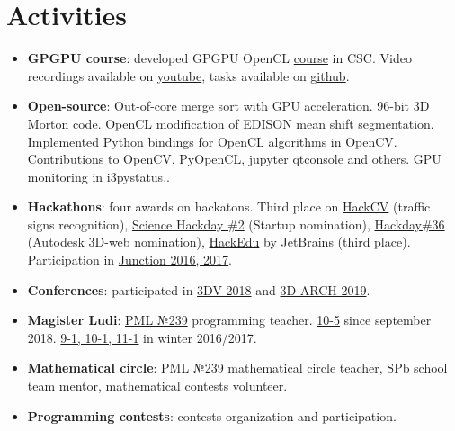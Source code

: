 \documentclass[11pt,oneside]{article}
\newcommand{\hhref}[2]{\href{#1}{\color{blue}#2}}
\begin{document}
\vspace{-9pt}
\section*{\textbf{Activities}}
\vspace{-9pt}

\begin{itemize}
    \item{\textbf{GPGPU course}}: developed GPGPU OpenCL \hhref{https://compscicenter.ru/courses/video_cards_computation/2018-autumn/classes/}{course} in CSC. Video recordings available on \hhref{https://www.youtube.com/watch?v=L79PgDOcVfw&list=PLlb7e2G7aSpTgwAm0GBkvn5XA0NokovJJ}{youtube}, tasks available on \hhref{https://github.com/GPGPUCourse2018/Tasks}{github}.

    \item{\textbf{Open-source}: \hhref{https://github.com/PolarNick239/ExternalSortingOnGPU}{Out-of-core merge sort} with GPU acceleration. \hhref{https://gist.github.com/PolarNick239/7819fb7722fab09b37ecaee77c82cf58}{96-bit 3D Morton code}. OpenCL \hhref{https://github.com/PolarNick239/OpenMeanShift}{modification} of EDISON mean shift segmentation. \hhref{https://github.com/opencv/opencv/pull/6078}{Implemented} Python bindings for OpenCL algorithms in OpenCV. Contributions to OpenCV, PyOpenCL, jupyter qtconsole and others. GPU monitoring in i3pystatus.}.

    \item{\textbf{Hackathons}}: four awards on hackatons. Third place on \hhref{https://career.luxoft.com/lp/hack-cv/}{HackCV} (traffic signs recognition), \hhref{http://hackday.ru/sciencehackday-2/projects\#project-1400}{Science Hackday \#2} (Startup nomination), \hhref{http://hackday.ru/hackday-36/projects\#project-1121}{Hackday\#36} (Autodesk 3D-web nomination), \hhref{https://www.hackerleague.org/hackathons/jetbrains-edtech-hackathon/blogposts/53655896e24d32cfbd000006}{HackEdu} by JetBrains (third place). Participation in \hhref{http://www.hackjunction.com/}{Junction 2016, 2017}.

    \item{\textbf{Conferences}}: participated in \hhref{http://3dv18.uniud.it/}{3DV 2018} and \hhref{http://www.3d-arch.org/}{3D-ARCH 2019}.

    \item{\textbf{Magister Ludi}}: \hhref{http://239.ru}{PML №239} programming teacher. \hhref{http://polarnick.com/blogs/239/2018/index_ru.html}{10-5} since september 2018. \hhref{http://polarnick239.github.io/239/201612}{9-1, 10-1, 11-1} in winter 2016/2017.

    \item{\textbf{Mathematical circle}}: PML №239 mathematical circle teacher, SPb school team mentor, mathematical contests volunteer.

    \item{\textbf{Programming contests}}: contests organization and participation.
\end{itemize}
\end{document}

